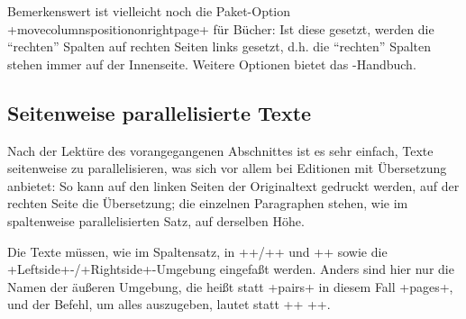 Bemerkenswert ist vielleicht noch die Paket-Option +movecolumnspositiononrightpage+ für Bücher: Ist diese gesetzt, werden die \enquote{rechten} Spalten auf rechten Seiten links gesetzt, d.h. die \enquote{rechten} Spalten stehen immer auf der Innenseite. Weitere Optionen bietet das \reledpar-Handbuch.


\subsection{Seitenweise parallelisierte Texte}

Nach der Lektüre des vorangegangenen Abschnittes ist es sehr einfach, Texte seitenweise zu parallelisieren, was sich vor allem bei Editionen mit Übersetzung anbietet: So kann auf den linken Seiten der Originaltext gedruckt werden, auf der rechten Seite die Übersetzung; die einzelnen Paragraphen stehen, wie im spaltenweise parallelisierten Satz, auf derselben Höhe.

Die Texte müssen, wie im Spaltensatz, in +\beginnumbering+/+\endnumbering+ und +\autopar+ sowie die +Leftside+-/+Rightside+-Umgebung eingefaßt werden. Anders sind hier nur die Namen der äußeren Umgebung, die heißt statt +pairs+ in diesem Fall +pages+, und der Befehl, um alles auszugeben, lautet statt +\Columns+ +\Pages+.



%
%
\UndefineShortVerb{\+}

